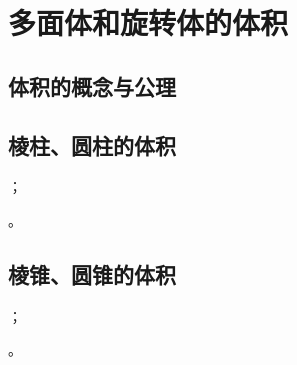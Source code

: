 \section{多面体和旋转体的体积}
\subsection{体积的概念与公理}
\begin{Practice}
  \begin{question}
    \item 
    \item 
  \end{question}
\end{Practice}
\subsection{棱柱、圆柱的体积}
\begin{Practice}
  \begin{question}
    \item ；
    \item 。
  \end{question}
\end{Practice}
\begin{Exercise}
  \begin{question}
    \item 
    \item 
    \item 
    \item 
    \item 
    \item 
    \item 
    \item 
    \item 
    \item 
    \item 
    \item 
  \end{question}
\end{Exercise}
\subsection{棱锥、圆锥的体积}
\begin{Practice}
  \begin{question}
    \item ；
    \item 。
  \end{question}
\end{Practice}

